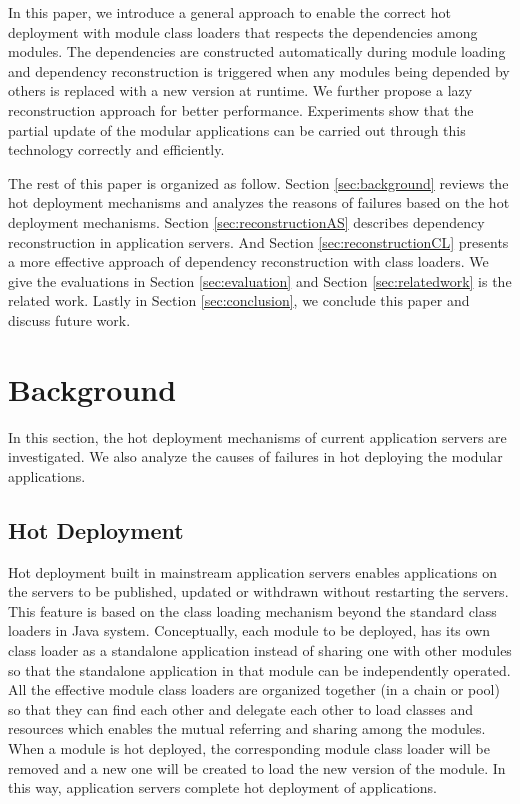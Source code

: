 \documentclass[conference]{IEEEtran}
\begin{document}
In this paper, we introduce a general approach to enable the correct hot deployment  with module class loaders that respects the dependencies among modules. The dependencies are constructed automatically during module loading and dependency reconstruction is triggered when any modules being depended by others is replaced with a new version at runtime. We further propose a lazy reconstruction approach for better performance. Experiments show that the partial update of the modular applications can be carried out through this technology correctly and efficiently.

The rest of this paper is organized as follow. 
Section \ref{sec:background} reviews the hot deployment mechanisms and analyzes the reasons of failures based on the hot deployment mechanisms. Section \ref{sec:reconstructionAS} describes dependency reconstruction in application servers. And Section \ref{sec:reconstructionCL} presents a more effective approach of dependency reconstruction with class loaders.
We give the evaluations in Section \ref{sec:evaluation} and Section \ref{sec:relatedwork} is the related work. Lastly in Section \ref{sec:conclusion}, we conclude this paper and discuss future work.



\section{Background\label{sec:background}}
In this section, the hot deployment mechanisms of current application servers are investigated. We also analyze the causes of failures in hot deploying the modular applications.

\subsection{Hot Deployment}

Hot deployment built in mainstream application servers enables applications on the servers to be published, updated or withdrawn without restarting the servers. This feature is based on the class loading mechanism beyond the standard class loaders\cite{standard_cl} in Java system. Conceptually, each module to be deployed, has its own class loader as a standalone application instead of sharing one with other modules so that the standalone application in that module can be independently operated. All the effective module class loaders are organized together (in a chain or pool) so that they can find each other and delegate each other to load classes and resources which enables the mutual referring and sharing among the modules. When a module is hot deployed, the corresponding module class loader will be removed and a new one will be created to load the new version of the module. In this way, application servers complete hot deployment of applications\cite{module_cl}.
\end{document}
